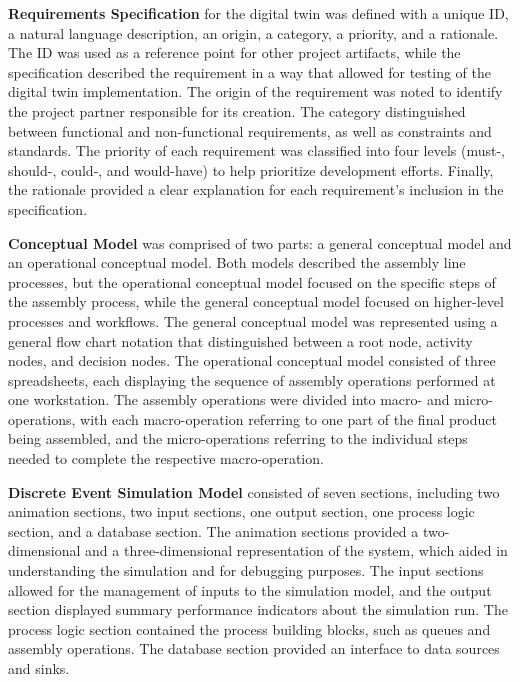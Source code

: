 \documentclass{llncs}
\begin{document}
    \textbf{Requirements Specification} for the digital twin was defined with a unique ID, a natural language description, an origin, a category, a priority, and a rationale. The ID was used as a reference point for other project artifacts, while the specification described the requirement in a way that allowed for testing of the digital twin implementation. The origin of the requirement was noted to identify the project partner responsible for its creation. The category distinguished between functional and non-functional requirements, as well as constraints and standards. The priority of each requirement was classified into four levels 
    (must-, should-, could-, and would-have) to help prioritize development efforts. 
    Finally, the rationale provided a clear explanation for each requirement's inclusion in the specification.

    \textbf{Conceptual Model} was comprised of two parts:  a general conceptual model and an operational conceptual model. Both models described the assembly line processes, but the operational conceptual model focused on the specific steps of the assembly process, while the general conceptual model focused on higher-level processes and workflows.
    The general conceptual model was represented using a general flow chart notation that distinguished between a root node, activity nodes, and decision nodes.
    The operational conceptual model consisted of three spreadsheets, each displaying the sequence of assembly operations performed at one workstation. 
    The assembly operations were divided into macro- and micro-operations, with each macro-operation referring 
    to one part of the final product being assembled, and the micro-operations referring to the individual steps needed to complete the respective macro-operation.

    \textbf{Discrete Event Simulation Model} consisted of seven sections, including two animation sections, two input sections, one output section, one process logic section, and a database section. The animation sections provided a two-dimensional and a three-dimensional representation of the system, which aided in understanding the simulation and for debugging purposes. The input sections allowed for the management of inputs to the simulation model, and the output section displayed summary performance indicators about the simulation run. 
    The process logic section contained the process building blocks, such as queues and assembly operations. The database section provided an interface to data sources and sinks.
    
\end{document}
